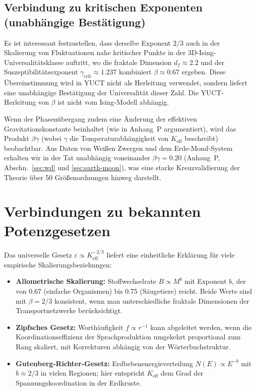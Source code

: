 \documentclass[12pt]{article}
\newcommand{\Keff}{K_{\mathrm{eff}}}
\newcommand{\eps}{\varepsilon}
\begin{document}
	\subsection*{Verbindung zu kritischen Exponenten (unabhängige Bestätigung)}
	Es ist interessant festzustellen, dass derselbe Exponent \(2/3\) auch in der Skalierung von Fluktuationen nahe kritischer Punkte in der 3D-Ising-Universalitätsklasse auftritt, wo die fraktale Dimension \(d_f \approx 2.2\) und der Suszeptibilitätsexponent \(\gamma_{\mathrm{crit}} \approx 1.237\) kombiniert \(\beta \approx 0.67\) ergeben. Diese Übereinstimmung wird in YUCT nicht als Herleitung verwendet, sondern liefert eine unabhängige Bestätigung der Universalität dieser Zahl. Die YUCT-Herleitung von \(\beta\) ist nicht vom Ising-Modell abhängig.
	
	Wenn der Phasenübergang zudem eine Änderung der effektiven Gravitationskonstante beinhaltet (wie in Anhang~P argumentiert), wird das Produkt \(\beta\gamma\) (wobei \(\gamma\) die Temperaturabhängigkeit von \(K_{\mathrm{eff}}\) beschreibt) beobachtbar. Aus Daten von Weißen Zwergen und dem Erde‑Mond‑System erhalten wir in der Tat unabhängig voneinander \(\beta\gamma = 0.20\) (Anhang~P, Abschn.~\ref{sec:wd} und \ref{sec:earth-moon}), was eine starke Kreuzvalidierung der Theorie über 50 Größenordnungen hinweg darstellt.
	
	\section{Verbindungen zu bekannten Potenzgesetzen}
	\label{sec:connections}
	
	Das universelle Gesetz \(\eps \propto \Keff^{-2/3}\) liefert eine einheitliche Erklärung für viele empirische Skalierungsbeziehungen:
	
	\begin{itemize}
		\item \textbf{Allometrische Skalierung:} Stoffwechselrate \(B \propto M^{b}\) mit Exponent \(b\), der von \(0.67\) (einfache Organismen) bis \(0.75\) (Säugetiere) reicht. Beide Werte sind mit \(\beta = 2/3\) konsistent, wenn man unterschiedliche fraktale Dimensionen der Transportnetzwerke berücksichtigt.
		\item \textbf{Zipfsches Gesetz:} Worthäufigkeit \(f \propto r^{-1}\) kann abgeleitet werden, wenn die Koordinationseffizienz der Sprachproduktion umgekehrt proportional zum Rang skaliert, mit Korrekturen abhängig von der Wörterbuchstruktur.
		\item \textbf{Gutenberg‑Richter-Gesetz:} Erdbebenenergieverteilung \(N(E) \propto E^{-b}\) mit \(b \approx 2/3\) in vielen Regionen; hier entspricht \(\Keff\) dem Grad der Spannungskoordination in der Erdkruste.
	\end{itemize}
	
\end{document}
